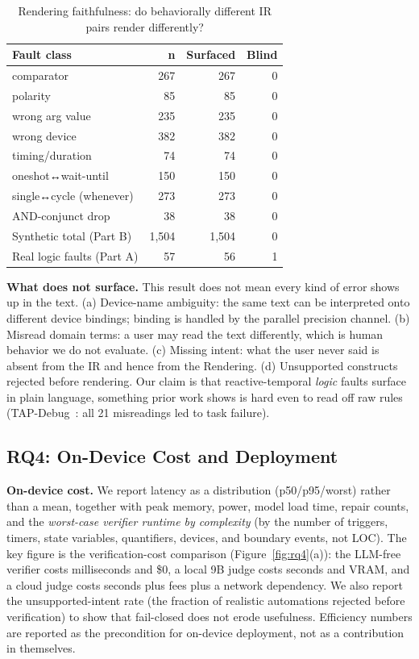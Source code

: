 \documentclass[sigconf,nonacm,anonymous,review]{acmart}
\begin{document}
\begin{table}[t]
\centering
\caption{Rendering faithfulness: do behaviorally different IR pairs render differently?}
\label{tab:faithful}
\small
\begin{tabular}{lrrr}
\toprule
Fault class & n & Surfaced & Blind \\
\midrule
comparator                & 267 & 267 & 0 \\
polarity                  & 85  & 85  & 0 \\
wrong arg value           & 235 & 235 & 0 \\
wrong device              & 382 & 382 & 0 \\
timing/duration           & 74  & 74  & 0 \\
oneshot↔wait-until        & 150 & 150 & 0 \\
single↔cycle (whenever)   & 273 & 273 & 0 \\
AND-conjunct drop         & 38  & 38  & 0 \\
\midrule
Synthetic total (Part B)   & 1,504 & 1,504 & 0 \\
Real logic faults (Part A) & 57  & 56  & 1 \\
\bottomrule
\end{tabular}
\end{table}

\textbf{What does not surface.} This result does not mean every kind of error shows up in the text. (a) Device-name ambiguity: the same text can be interpreted onto different device bindings; binding is handled by the parallel precision channel. (b) Misread domain terms: a user may read the text differently, which is human behavior we do not evaluate. (c) Missing intent: what the user never said is absent from the IR and hence from the Rendering. (d) Unsupported constructs rejected before rendering. Our claim is that reactive-temporal \emph{logic} faults surface in plain language, something prior work shows is hard even to read off raw rules (TAP-Debug~\cite{tapdebug}: all 21 misreadings led to task failure).

\subsection{RQ4: On-Device Cost and Deployment}

\textbf{On-device cost.} We report latency as a distribution (p50/p95/worst) rather than a mean, together with peak memory, power, model load time, repair counts, and the \emph{worst-case verifier runtime by complexity} (by the number of triggers, timers, state variables, quantifiers, devices, and boundary events, not LOC). The key figure is the verification-cost comparison (Figure~\ref{fig:rq4}(a)): the LLM-free verifier costs milliseconds and \$0, a local 9B judge costs seconds and VRAM, and a cloud judge costs seconds plus fees plus a network dependency. We also report the unsupported-intent rate (the fraction of realistic automations rejected before verification) to show that fail-closed does not erode usefulness. Efficiency numbers are reported as the precondition for on-device deployment, not as a contribution in themselves.
\end{document}
